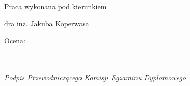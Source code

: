 \begin{titlepage}
 \vspace{3cm}
 
 \hfill Praca wykonana pod kierunkiem
 
 \hfill dra inż. Jakuba Koperwasa
 
 \vspace{3cm}

 \begin{flushleft}
  \begin{minipage}{7cm}
   Ocena: \dotfill \\ \\
   \hspace*{0cm} \dotfill \\[-0.7cm]
   \begin{center}
    \small\textit{Podpis Przewodniczącego Komisji Egzaminu Dyplomowego}
   \end{center}
  \end{minipage}
 \end{flushleft}

\end{titlepage}


\newpage
\thispagestyle{empty}

